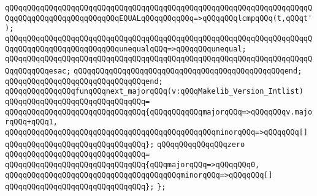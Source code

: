 \verb|qQQqqQQqqQQqqQQqqQQqqQQqqQQqqQQqqQQqqQQqqQQqqQQqqQQqqQQqqQQqqQQqqQQqqQQqqQQqqQQqqQQqqQQqqQQqqQQqEQUALqQQqqQQqqQQq=>qQQqqQQqlcmpqQQq(t,qQQqt');|\newline
\verb|qQQqqQQqqQQqqQQqqQQqqQQqqQQqqQQqqQQqqQQqqQQqqQQqqQQqqQQqqQQqqQQqqQQqqQQqqQQqqQQqqQQqqQQqqQQqqQQqunequalqQQq=>qQQqqQQqunequal;|\newline
\verb|qQQqqQQqqQQqqQQqqQQqqQQqqQQqqQQqqQQqqQQqqQQqqQQqqQQqqQQqqQQqqQQqqQQqqQQqqQQqqQQqesac;|\newline
\verb|qQQqqQQqqQQqqQQqqQQqqQQqqQQqqQQqqQQqqQQqqQQqqQQqend;|\newline
\verb|qQQqqQQqqQQqqQQqqQQqqQQqqQQqqQQqend;|\newline
\newline
\verb|qQQqqQQqqQQqqQQqfunqQQqnext_majorqQQq(v:qQQqMakelib_Version_Intlist)|\newline
\verb|qQQqqQQqqQQqqQQqqQQqqQQqqQQqqQQq=|\newline
\verb|qQQqqQQqqQQqqQQqqQQqqQQqqQQqqQQq{qQQqqQQqqQQqmajorqQQq=>qQQqqQQqv.majorqQQq+qQQq1,|\newline
\verb|qQQqqQQqqQQqqQQqqQQqqQQqqQQqqQQqqQQqqQQqqQQqqQQqminorqQQq=>qQQqqQQq[]|\newline
\verb|qQQqqQQqqQQqqQQqqQQqqQQqqQQqqQQq};|\newline
\newline
\verb|qQQqqQQqqQQqqQQqzero|\newline
\verb|qQQqqQQqqQQqqQQqqQQqqQQqqQQqqQQq=|\newline
\verb|qQQqqQQqqQQqqQQqqQQqqQQqqQQqqQQq{qQQqmajorqQQq=>qQQqqQQq0,|\newline
\verb|qQQqqQQqqQQqqQQqqQQqqQQqqQQqqQQqqQQqqQQqminorqQQq=>qQQqqQQq[]|\newline
\verb|qQQqqQQqqQQqqQQqqQQqqQQqqQQqqQQq};|\newline
\verb|};|\newline
\newline

